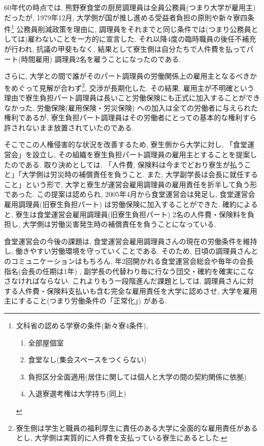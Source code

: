 		60年代の時点では, 熊野寮食堂の厨房調理員は全員公務員(つまり大学が雇用主) だったが, 1979年12月, 大学側が国が推し進める受益者負担の原則や新々寮四条件\footnote{文科省の認める学寮の条件(新々寮4条件),
\begin{enumerate}
\item 全部屋個室
\item 食堂なし(集会スペースをつくらない)
\item 負担区分全面適用(居住に関しては個人と大学の間の契約関係に依拠)
\item 入退寮選考権は大学持ち(同上)
\end{enumerate}}
公務員削減政策を理由に, 調理員をそれまでと同じ条件では(つまり公務員としては)雇わないことを一方的に宣言した. それ以降4度の臨時職員の後任不補充が行われ, 抗議の甲斐もなく, 結果として寮生側は自分たちで人件費を払ってパート(時間雇用) 調理員2名を雇うことになったのである.

		さらに, 大学との間で誰がそのパート調理員の労働関係上の雇用主となるべきかをめぐって見解が合わず\footnote{寮生側は学生と職員の福利厚生に責任のある大学に全面的な雇用責任があるとし, 大学側は実質的に人件費を支払っている寮生にあるとした. }, 交渉が長期化した. その結果, 雇用主が不明確という理由で寮生負担パート調理員は長いこと労働保険にも正式に加入することができなかった. 労働保険(雇用保険・労災保険) への加入は全ての労働者に与えられた権利であるが, 寮生負担パート調理員はその労働者にとっての基本的な権利すら許されないまま放置されていたのである.

		そこでこの人権侵害的な状況を改善するため, 寮生側から大学に対し, 「食堂運営会」を設立し, その組織を寮生負担パート調理員の雇用主とすることを提案したのである. 取り決めとしては, 「人件費, 保険料は今までどおり寮生が払うこと」「大学側は労災時の補償責任を負うこと. また, 大学副学長は会長に就任すること」という形で, 大学と寮生が運営会雇用調理員の雇用責任を折半して負う形であった. この提案は認められ, 2005年4月から食堂運営会は発足し, 食堂運営会雇用調理員(旧寮生負担パート) は労働保険に加入することができた. 確約によると, 寮生は食堂運営会雇用調理員(旧寮生負担パート) 2名の人件費・保険料を負担し, 大学側は労働災害発生時の補償責任を負うことになっている.

		食堂運営会の今後の課題は, 食堂運営会雇用調理員さんの現在の労働条件を維持し, 働きやすい労働環境を守っていくことである. そのため, 日頃の調理員さんとのコミュニケーションはもちろん, 年2回開かれる食堂運営会総会や毎年の会長指名(会長の任期は1年) , 副学長の代替わり毎に行なう団交・確約を確実にこなさなければならない. これよりもう一段階進んだ課題としては, 調理員さんに対する人件費・保険料支払いも含む完全な雇用責任を大学に認めさせ, 大学を雇用主にすること(つまり労働条件の「正常化」) がある.

